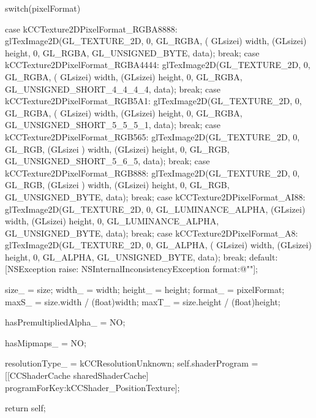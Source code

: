 \begin{DoxyCode}
{{                switch(pixelFormat)
                {
                        case kCCTexture2DPixelFormat_RGBA8888:
                                glTexImage2D(GL_TEXTURE_2D, 0, GL_RGBA, (
      GLsizei) width, (GLsizei) height, 0, GL_RGBA, GL_UNSIGNED_BYTE, data);
                                break;
                        case kCCTexture2DPixelFormat_RGBA4444:
                                glTexImage2D(GL_TEXTURE_2D, 0, GL_RGBA, (
      GLsizei) width, (GLsizei) height, 0, GL_RGBA, GL_UNSIGNED_SHORT_4_4_4_4, data);
                                break;
                        case kCCTexture2DPixelFormat_RGB5A1:
                                glTexImage2D(GL_TEXTURE_2D, 0, GL_RGBA, (
      GLsizei) width, (GLsizei) height, 0, GL_RGBA, GL_UNSIGNED_SHORT_5_5_5_1, data);
                                break;
                        case kCCTexture2DPixelFormat_RGB565:
                                glTexImage2D(GL_TEXTURE_2D, 0, GL_RGB, (GLsizei
      ) width, (GLsizei) height, 0, GL_RGB, GL_UNSIGNED_SHORT_5_6_5, data);
                                break;
                        case kCCTexture2DPixelFormat_RGB888:
                                glTexImage2D(GL_TEXTURE_2D, 0, GL_RGB, (GLsizei
      ) width, (GLsizei) height, 0, GL_RGB, GL_UNSIGNED_BYTE, data);
                                break;
                        case kCCTexture2DPixelFormat_AI88:
                                glTexImage2D(GL_TEXTURE_2D, 0, 
      GL_LUMINANCE_ALPHA, (GLsizei) width, (GLsizei) height, 0, GL_LUMINANCE_ALPHA, GL_UNSIGNED_BYTE, 
      data);
                                break;
                        case kCCTexture2DPixelFormat_A8:
                                glTexImage2D(GL_TEXTURE_2D, 0, GL_ALPHA, (
      GLsizei) width, (GLsizei) height, 0, GL_ALPHA, GL_UNSIGNED_BYTE, data);
                                break;
                        default:
                                [NSException raise:
      NSInternalInconsistencyException format:@""];

                }

                size_ = size;
                width_ = width;
                height_ = height;
                format_ = pixelFormat;
                maxS_ = size.width / (float)width;
                maxT_ = size.height / (float)height;

                hasPremultipliedAlpha_ = NO;

                hasMipmaps_ = NO;

                resolutionType_ = kCCResolutionUnknown;
                self.shaderProgram = [[CCShaderCache sharedShaderCache] 
      programForKey:kCCShader_PositionTexture];
        }
        return self;
}
\end{DoxyCode}
